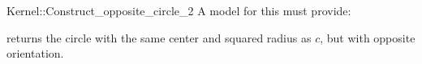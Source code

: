 \begin{ccRefFunctionObjectConcept}{Kernel::Construct_opposite_circle_2}
A model for this must provide:


{ returns the circle with the same center and squared radius as
  $c$, but with opposite orientation.}

\ccIsModel{}

\end{ccRefFunctionObjectConcept}
